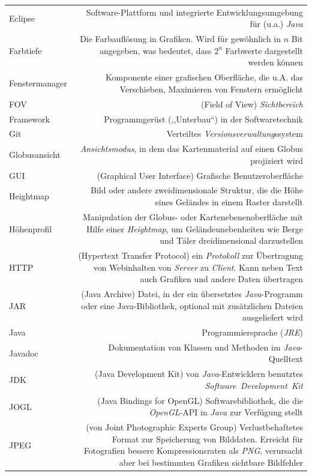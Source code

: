 \documentclass[10pt]{scrreprt}
\newcommand{\textref}[1]{\mbox{\raisebox{0.1ex}{\small$\rightarrow$ }\textit{#1}}}
\begin{document}
\begin{longtabu}{L{0.35} R{1.65}}
Eclipse & Software-Plattform und integrierte Entwicklungsumgebung für (u.a.) \textref{Java}\\
Farbtiefe & Die Farbauflösung in Grafiken. Wird für gewöhnlich in $n$ Bit angegeben, was bedeutet, dass $2^n$ Farbwerte dargestellt werden können\\
Fenstermanager & Komponente einer grafischen Oberfläche, die u.A. das Verschieben, Maximieren von Fenstern ermöglicht\\
FOV & (Field of View) \textref{Sichtbereich}\\
Framework & Programmgerüst (,,Unterbau``) in der Softwaretechnik \\
Git & Verteiltes \textref{Versionsverwaltung}ssystem\\
Globusansicht & \textref{Ansichtsmodus}, in dem das Kartenmaterial auf einen Globus projiziert wird\\
GUI& (Graphical User Interface) Grafische Benutzeroberfläche\\
Heightmap & Bild oder andere zweidimensionale Struktur, die die Höhe eines Geländes in einem Raster darstellt\\
Höhenprofil & Manipulation der Globus- oder Kartenebenenoberfläche mit Hilfe einer \textref{Heightmap}, um Geländeunebenheiten wie Berge und Täler dreidimensional darzustellen\\
HTTP & (Hypertext Transfer Protocol) ein \textref{Protokoll} zur Übertragung von Webinhalten von \textref{Server} zu \textref{Client}. Kann neben Text auch Grafiken und andere Daten übertragen\\
JAR & (Java Archive) Datei, in der ein übersetztes \textref{Java}-Programm oder eine Java-Bibliothek, optional mit zusätzlichen Dateien ausgeliefert wird\\
Java & Programmiersprache (\textref{JRE})\\
Javadoc & Dokumentation von Klassen und Methoden im \textref{Java}-Quelltext\\
JDK & (Java Development Kit) von \textref{Java}-Entwicklern benutztes \textref{Software Development Kit}\\
JOGL & (Java Bindings for OpenGL) Softwarebibliothek, die die \textref{OpenGL}-API in \textref{Java} zur Verfügung stellt\\
JPEG & (von Joint Photographic Experts Group) Verlustbehaftetes Format zur Speicherung von Bilddaten. Erreicht für Fotografien bessere Kompressionsraten als \textref{PNG}, verursacht aber bei bestimmten Grafiken sichtbare Bildfehler\\

\end{longtabu}
\end{document}
